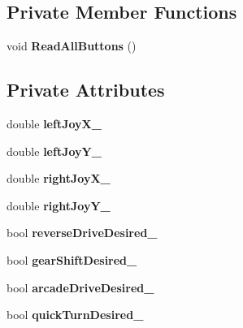 \subsection*{Private Member Functions}
\begin{DoxyCompactItemize}
\item 
\mbox{\label{class_control_board_a119aafaac10209d3a0ed71a3ecbf0a8a}} 
void {\bfseries Read\+All\+Buttons} ()
\end{DoxyCompactItemize}
\subsection*{Private Attributes}
\begin{DoxyCompactItemize}
\item 
\mbox{\label{class_control_board_aa416e9616eb5e9650274fe609deef35a}} 
double {\bfseries left\+Joy\+X\+\_\+}
\item 
\mbox{\label{class_control_board_a62d7b23bd7d3a4d1362d13b67ed706b1}} 
double {\bfseries left\+Joy\+Y\+\_\+}
\item 
\mbox{\label{class_control_board_a4c2f86c6e0dac63ed07a8a8e0ff08f96}} 
double {\bfseries right\+Joy\+X\+\_\+}
\item 
\mbox{\label{class_control_board_aae31045f2a49fdd74bf149529dd3ad4d}} 
double {\bfseries right\+Joy\+Y\+\_\+}
\item 
\mbox{\label{class_control_board_a9801f6d198aba04809ceae4226d37e31}} 
bool {\bfseries reverse\+Drive\+Desired\+\_\+}
\item 
\mbox{\label{class_control_board_ad7999d7ba82292494c4672ea512e3b9e}} 
bool {\bfseries gear\+Shift\+Desired\+\_\+}
\item 
\mbox{\label{class_control_board_a78bd6b9dda2e0035527b16f35a09c5ae}} 
bool {\bfseries arcade\+Drive\+Desired\+\_\+}
\item 
\mbox{\label{class_control_board_a59b412d2fab63ecd421419bec6710d5d}} 
bool {\bfseries quick\+Turn\+Desired\+\_\+}

\end{DoxyCompactItemize}
